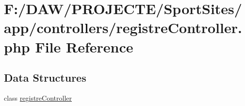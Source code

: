 \hypertarget{registre_controller_8php}{}\section{F\+:/\+D\+A\+W/\+P\+R\+O\+J\+E\+C\+T\+E/\+Sport\+Sites/app/controllers/registre\+Controller.php File Reference}
\label{registre_controller_8php}
\subsection*{Data Structures}
\begin{DoxyCompactItemize}
\item 
class \hyperlink{classregistre_controller}{registre\+Controller}
\end{DoxyCompactItemize}
